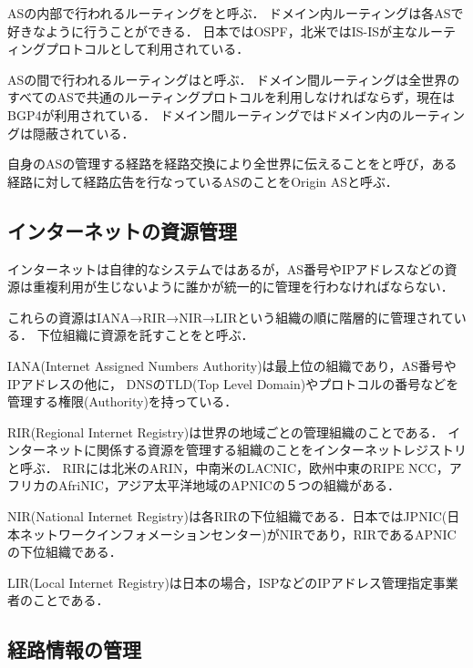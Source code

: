 ASの内部で行われるルーティングをと呼ぶ．
ドメイン内ルーティングは各ASで好きなように行うことができる．
日本ではOSPF，北米ではIS-ISが主なルーティングプロトコルとして利用されている．

ASの間で行われるルーティングはと呼ぶ．
ドメイン間ルーティングは全世界のすべてのASで共通のルーティングプロトコルを利用しなければならず，現在はBGP4が利用されている．
ドメイン間ルーティングではドメイン内のルーティングは隠蔽されている．

自身のASの管理する経路を経路交換により全世界に伝えることをと呼び，ある経路に対して経路広告を行なっているASのことをOrigin ASと呼ぶ．

\subsection{インターネットの資源管理}

インターネットは自律的なシステムではあるが，AS番号やIPアドレスなどの資源は重複利用が生じないように誰かが統一的に管理を行わなければならない．

これらの資源はIANA→RIR→NIR→LIRという組織の順に階層的に管理されている．
下位組織に資源を託すことをと呼ぶ．

IANA(Internet Assigned Numbers Authority)は最上位の組織であり，AS番号やIPアドレスの他に，
DNSのTLD(Top Level Domain)やプロトコルの番号などを管理する権限(Authority)を持っている．

RIR(Regional Internet Registry)は世界の地域ごとの管理組織のことである．
インターネットに関係する資源を管理する組織のことをインターネットレジストリと呼ぶ．
RIRには北米のARIN，中南米のLACNIC，欧州中東のRIPE NCC，アフリカのAfriNIC，アジア太平洋地域のAPNICの５つの組織がある．

NIR(National Internet Registry)は各RIRの下位組織である．日本ではJPNIC(日本ネットワークインフォメーションセンター)がNIRであり，RIRであるAPNICの下位組織である．

LIR(Local Internet Registry)は日本の場合，ISPなどのIPアドレス管理指定事業者のことである．

\subsection{経路情報の管理}



%
%
